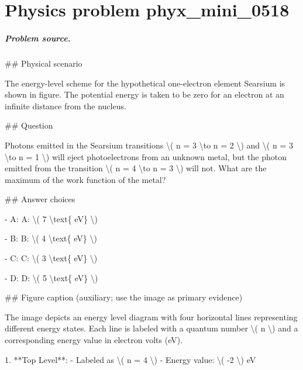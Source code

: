 
\chapter{Physics problem phyx\_mini\_0518}
\label{ch:PhyXMiniProblems_problem_phyx_mini_0518}

\paragraph{Problem source.}
\#\# Physical scenario

The energy-level scheme for the hypothetical one-electron element Searsium is shown in figure. The potential energy is taken to be zero for an electron at an infinite distance from the nucleus.

\#\# Question

Photons emitted in the Searsium transitions \textbackslash{}( n = 3 \textbackslash{}to n = 2 \textbackslash{}) and \textbackslash{}( n = 3 \textbackslash{}to n = 1 \textbackslash{}) will eject photoelectrons from an unknown metal, but the photon emitted from the transition \textbackslash{}( n = 4 \textbackslash{}to n = 3 \textbackslash{}) will not. What are the maximum of the work function of the metal?

\#\# Answer choices

- A: A: \textbackslash{}( 7 \textbackslash{}text\{ eV\} \textbackslash{})

- B: B: \textbackslash{}( 4 \textbackslash{}text\{ eV\} \textbackslash{})

- C: C: \textbackslash{}( 3 \textbackslash{}text\{ eV\} \textbackslash{})

- D: D: \textbackslash{}( 5 \textbackslash{}text\{ eV\} \textbackslash{})

\#\# Figure caption (auxiliary; use the image as primary evidence)

The image depicts an energy level diagram with four horizontal lines representing different energy states. Each line is labeled with a quantum number \textbackslash{}( n \textbackslash{}) and a corresponding energy value in electron volts (eV).

1. **Top Level**: 
   - Labeled as \textbackslash{}( n = 4 \textbackslash{})
   - Energy value: \textbackslash{}( -2 \textbackslash{}) eV

